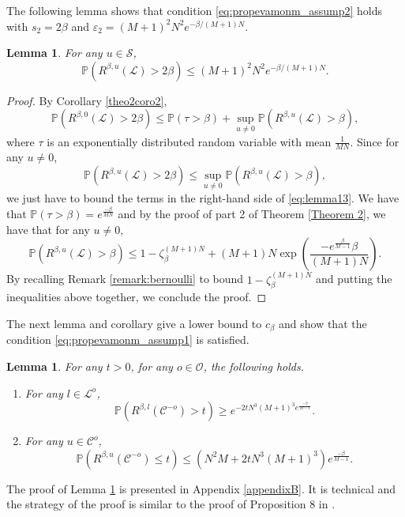 \documentclass[11pt]{article}
\newtheorem{lemma}[theorem]{Lemma}
\theoremstyle{definition}
\newcommand{\st}{\mathcal{S}}
\newcommand{\opn}{\mathcal{O}}
\def\P{{\mathbb P}}
\begin{document}
The following lemma shows that condition \eqref{eq:propevamonm_assump2} holds with $s_2=2\beta$ and $\varepsilon_2= (M+1)^2N^2e^{-\beta /(M+1)N}$.

\begin{lemma} \label{theo3lemm1} For any $u \in \st$,
    $$
\mathbb{P}(R^{\beta,u}(\mathcal{L})>2\beta)
\leq  (M+1)^2N^2e^{-\beta /(M+1)N}.
$$
\end{lemma}
\begin{proof} 
By Corollary \ref{theo2coro2},
\begin{equation} \label{eq:lemma13}
\mathbb{P}(R^{\beta,0}(\mathcal{L})>2\beta)\leq \P(\tau>\beta)+\sup_{u\neq 0}\mathbb{P}(R^{\beta,u}(\mathcal{L})>\beta),
\end{equation}
where $\tau$ is an exponentially distributed random variable with mean $\frac{1}{MN}$.
Since for any $u\neq 0$,
$$
\mathbb{P}(R^{\beta,u}(\mathcal{L})>2\beta)\leq \sup_{u\neq 0}\mathbb{P}(R^{\beta,u}(\mathcal{L})>\beta),
$$
we just have to bound the terms in the right-hand side of \eqref{eq:lemma13}.
We have that  $\P(\tau>\beta)=e^{\frac{-\beta}{MN}}$ and by the proof of part 2 of Theorem \ref{Theorem 2}, we have that for any $u\neq 0$,
$$
\mathbb{P}(R^{\beta,u}(\mathcal{L})>\beta) \leq 1-\zeta_{\beta}^{(M+1)N}+(M+1)N\exp\left(\frac{-e^{\frac{\beta}{M-1}}\beta}{(M+1)N}\right).
$$
By recalling Remark \ref{remark:bernoulli} to bound $1-\zeta_{\beta}^{(M+1)N}$ and putting the inequalities above together, we conclude the proof.
\end{proof}


The next lemma and corollary give a lower bound to $c_{\beta}$ and show that the condition \eqref{eq:propevamonm_assump1} is satisfied.

\begin{lemma} \label{theo3lemm2}For any $t>0$, for any $o \in \opn$, the following holds.
\begin{enumerate}
    \item For any $l\in \mathcal{L}^o$,
    $$
    \P(R^{\beta,l}(\mathcal{C}^{-o})>t) \geq e^{-2tN^3(M+1)^3e^{\frac{-\beta}{M-1}}}.
    $$
    \item For any $u\in \mathcal{C}^{o}$,
    $$
\P(R^{\beta,u}(\mathcal{C}^{-o}) \leq t) \leq (N^2M+2tN^3(M+1)^3)e^{\frac{-\beta}{M-1}}.
$$
\end{enumerate}
\end{lemma}

The proof of Lemma \ref{theo3lemm2} is presented in Appendix \ref{appendixB}. It is technical and the strategy of the proof is similar to the proof of Proposition 8 in \cite{galves2024fastconsensusmetastabilityhighly}. 
\end{document}

